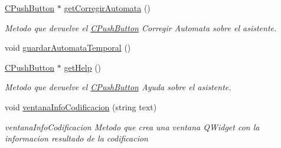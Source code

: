 \begin{DoxyCompactItemize}
\hyperlink{classCPushButton}{C\+Push\+Button} $\ast$ \hyperlink{classCAsistenteCodificacion_a4c1bda55c2989b2d231a7280e017f4b4}{get\+Corregir\+Automata} ()
\begin{DoxyCompactList}\small\item\em Metodo que devuelve el \hyperlink{classCPushButton}{C\+Push\+Button} Corregir Automata sobre el asistente. \end{DoxyCompactList}\item 
void \hyperlink{classCAsistenteCodificacion_afcefa5d9f23cfe6cad585cfeb1d31d37}{guardar\+Automata\+Temporal} ()
\item 
\hyperlink{classCPushButton}{C\+Push\+Button} $\ast$ \hyperlink{classCAsistenteCodificacion_adf9ae1bf08b445fb095246b95b723450}{get\+Help} ()
\begin{DoxyCompactList}\small\item\em Metodo que devuelve el \hyperlink{classCPushButton}{C\+Push\+Button} Ayuda sobre el asistente. \end{DoxyCompactList}\item 
void \hyperlink{classCAsistenteCodificacion_a8d5a01cef945d9a6b72dd54a9aaecec2}{ventana\+Info\+Codificacion} (string text)
\begin{DoxyCompactList}\small\item\em ventana\+Info\+Codificacion Metodo que crea una ventana Q\+Widget con la informacion resultado de la codificacion \end{DoxyCompactList}\end{DoxyCompactItemize}
